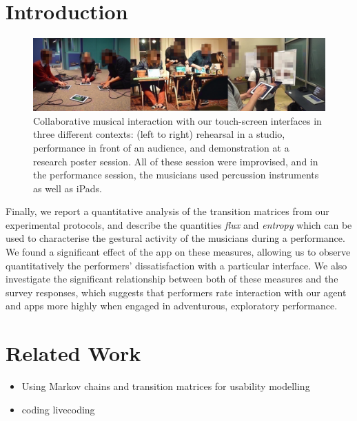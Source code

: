 \documentclass{sigchi}
\begin{document}

\section{Introduction}

\begin{figure}
  \centering
  \includegraphics[width=\linewidth]{figures/three-performance-contexts}
  \caption{Collaborative musical interaction with our touch-screen
    interfaces in three different contexts: (left to right) rehearsal
    in a studio,
    performance in front of an audience, and demonstration at a
    research poster session. All of these session were improvised,
    and in the performance session, the musicians used percussion
    instruments as well as iPads.
    \label{fig:three-performance-contexts}}
\end{figure}


Finally, we report a quantitative analysis of the transition matrices
from our experimental protocols, and describe the quantities
\emph{flux} and \emph{entropy} which can be used to characterise the
gestural activity of the musicians during a performance. We found a
significant effect of the app on these measures, allowing us to
observe quantitatively the performers' dissatisfaction with a
particular interface. We also investigate the significant relationship
between both of these measures and the survey responses, which
suggests that performers rate interaction with our agent and apps more
highly when engaged in adventurous, exploratory performance.

\section{Related Work}

\begin{itemize}
\item Using Markov chains and transition matrices for usability
  modelling~\cite{Thimbleby:2001kq,Thimbleby:2004fj}
\item coding livecoding~\cite{Swift:2014tya}
\end{itemize}
\end{document}
